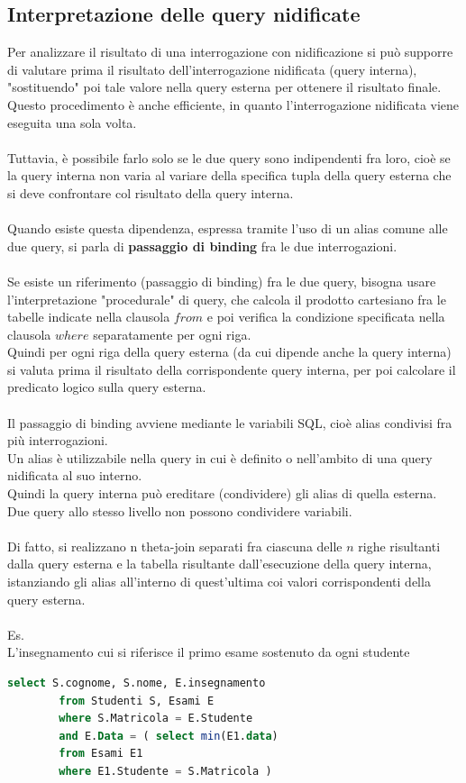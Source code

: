 \documentclass{article}
\begin{document}
	\subsection{Interpretazione delle query nidificate}
	Per analizzare il risultato di una interrogazione con nidificazione si può supporre di valutare prima il risultato dell’interrogazione nidificata (query interna), "sostituendo" poi tale valore nella query esterna per ottenere il risultato finale.\\
	Questo procedimento è anche efficiente, in quanto l’interrogazione nidificata viene eseguita una sola volta.\\\\
	Tuttavia, è possibile farlo solo se le due query sono indipendenti fra loro, cioè se la query interna non varia al variare della specifica tupla della query esterna che si deve confrontare col risultato della query interna.\\\\
	Quando esiste questa dipendenza, espressa tramite l’uso di un alias comune alle due query, si parla di \textbf{passaggio di binding} fra le due interrogazioni.\\\\
	Se esiste un riferimento (passaggio di binding) fra le due query, bisogna usare l’interpretazione "procedurale" di query, che calcola il prodotto cartesiano fra le tabelle indicate nella clausola $from$ e poi verifica la condizione specificata nella clausola $where$ separatamente per ogni riga.\\
	Quindi per ogni riga della query esterna (da cui dipende anche la query interna) si valuta prima il risultato della corrispondente query interna, per poi calcolare il predicato logico sulla query esterna.\\\\
	Il passaggio di binding avviene mediante le variabili SQL, cioè alias condivisi fra più interrogazioni. \\
	Un alias è utilizzabile nella query in cui è definito o nell’ambito di una query nidificata al suo interno.\\
	Quindi la query interna può ereditare (condividere) gli alias di quella esterna.\\
	Due query allo stesso livello non possono condividere variabili.\\\\
	Di fatto, si realizzano n theta-join separati fra ciascuna delle $n$ righe risultanti dalla query esterna e la tabella risultante dall'esecuzione della query interna, istanziando gli alias all'interno di quest'ultima coi valori corrispondenti della query esterna.\\\\
	Es. \\
	L’insegnamento cui si riferisce il primo esame sostenuto da ogni studente
	\begin{lstlisting}[language=SQL]
		select S.cognome, S.nome, E.insegnamento
		from Studenti S, Esami E
		where S.Matricola = E.Studente
		and E.Data = ( select min(E1.data)
		from Esami E1
		where E1.Studente = S.Matricola )
	\end{lstlisting}
\end{document}
